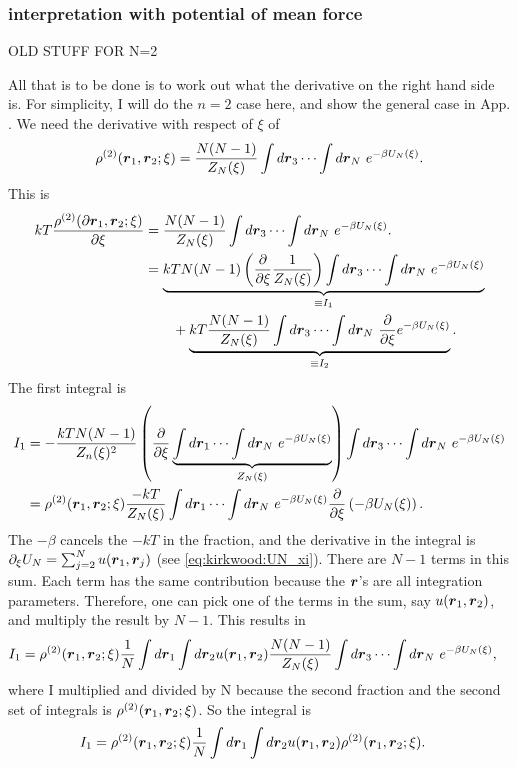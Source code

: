 \subsubsection{interpretation with potential of mean force}

OLD STUFF FOR N=2

All that is to be done is to work out what the derivative on the right hand side is.
For simplicity, I will do the $n=2$ case here, and show the general case in App. .
We need the derivative with respect of $\xi$ of
\begin{align}
\rho^{(2)}(\boldsymbol{r}_1,\boldsymbol{r}_2;\xi) =
\frac{N(N-1)}{Z_N(\xi)} \int d\boldsymbol{r}_3 \cdots \int d\boldsymbol{r}_N~
e^{-\beta U_N(\xi)}.
\end{align}
This is
\begin{align}\label{eq:kirkwood:first_deriv}
k T \frac{\rho^{(2)}(\partial \boldsymbol{r}_1,\boldsymbol{r}_2;\xi)}{\partial \xi} &=
\frac{N(N-1)}{Z_N(\xi)} \int d\boldsymbol{r}_3 \cdots \int d\boldsymbol{r}_N~
    e^{-\beta U_N(\xi)}. \\
&= 
    \underbrace{kT N (N-1) \left( \frac{\partial}{\partial \xi}
    \frac{1}{Z_N(\xi)} \right)
    \int d\boldsymbol{r}_3 \cdots \int d\boldsymbol{r}_N~ e^{-\beta U_N(\xi)}
    }_{ \equiv I_1}
    \nonumber \\
    &~~~~~~
    +\underbrace{ kT \frac{N(N-1)}{Z_N(\xi)}
    \int d\boldsymbol{r}_3 \cdots \int d\boldsymbol{r}_N~
    \frac{\partial}{\partial \xi}e^{-\beta U_N(\xi)}
    }_{\equiv I_2}.
\end{align}
The first integral is
\begin{align}
I_1 &= -\frac{kT N(N-1)}{Z_n(\xi)^2}
    \left( \frac{\partial}{\partial \xi}
        \underbrace{
        \int d\boldsymbol{r}_1 \cdots \int d\boldsymbol{r}_N~ e^{-\beta U_N(\xi)}
        }_{Z_N(\xi)}
    \right)
    \int d\boldsymbol{r}_3 \cdots \int d\boldsymbol{r}_N~ e^{-\beta U_N(\xi)} \\
&= \rho^{(2)}(\boldsymbol{r}_1,\boldsymbol{r}_2;\xi) \frac{-kT}{Z_N(\xi)}
    \int d\boldsymbol{r}_1 \cdots \int d\boldsymbol{r}_N~ e^{-\beta U_N(\xi)}
        \frac{\partial}{\partial \xi}
        \left( - \beta U_N(\xi) \right).
\end{align}
The $-\beta$ cancels the $-kT$ in the fraction, and the derivative in the integral is $\partial_\xi U_N = \sum_{j=2}^N u(\boldsymbol{r}_1,\boldsymbol{r}_j)$ (see \eqref{eq:kirkwood:UN_xi}).
There are $N-1$ terms in this sum.
Each term has the same contribution because the $\boldsymbol{r}$'s are all integration parameters.
Therefore, one can pick one of the terms in the sum, say $u(\boldsymbol{r}_1,\boldsymbol{r}_2)$, and multiply the result by $N-1$.
This results in
\begin{align}
I_1 &= \rho^{(2)}(\boldsymbol{r}_1,\boldsymbol{r}_2;\xi)\frac{1}{N}
    \int d\boldsymbol{r}_1 \int d\boldsymbol{r}_2 u(\boldsymbol{r}_1,\boldsymbol{r}_2)
    \frac{N(N-1)}{Z_N(\xi)}
    \int d\boldsymbol{r}_3 \cdots \int d\boldsymbol{r}_N~ e^{-\beta U_N(\xi)},
\end{align}
where I multiplied and divided by N because the second fraction and the second set of integrals is $\rho^{(2)}(\boldsymbol{r}_1,\boldsymbol{r}_2;\xi)$.
So the integral is
\begin{align}
I_1 &= \rho^{(2)}(\boldsymbol{r}_1,\boldsymbol{r}_2;\xi)\frac{1}{N}
    \int d\boldsymbol{r}_1 \int d\boldsymbol{r}_2 u(\boldsymbol{r}_1,\boldsymbol{r}_2)
    \rho^{(2)}(\boldsymbol{r}_1,\boldsymbol{r}_2;\xi).
\end{align}

